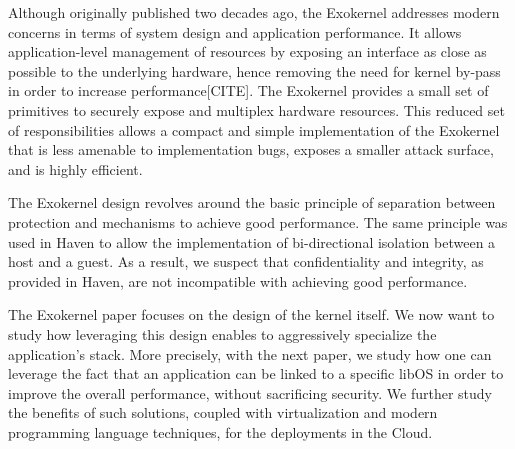 Although originally published two decades ago, the Exokernel addresses modern concerns in terms of system design and application performance.
It allows application-level management of resources by exposing an interface as close as possible to the underlying hardware, hence removing the need for kernel by-pass in order to increase performance[CITE].
The Exokernel provides a small set of primitives to securely expose and multiplex hardware resources.
This reduced set of responsibilities allows a compact and simple implementation of the Exokernel that is less amenable to implementation bugs, exposes a smaller attack surface, and is highly efficient.

The Exokernel design revolves around the basic principle of separation between protection and mechanisms to achieve good performance.
The same principle was used in Haven to allow the implementation of bi-directional isolation between a host and a guest.
As a result, we suspect that confidentiality and integrity, as provided in Haven, are not incompatible with achieving good performance.

The Exokernel paper focuses on the design of the kernel itself.
We now want to study how leveraging this design enables to aggressively specialize the application's stack.
More precisely, with the next paper, we study how one can leverage the fact that an application can be linked to a specific libOS in order to improve the overall performance, without sacrificing security.
We further study the benefits of such solutions, coupled with virtualization and modern programming language techniques, for the deployments in the Cloud.